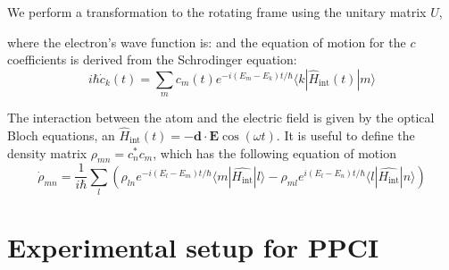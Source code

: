 \documentclass[11pt,letter]{article}
\newcommand{\bv}[1]{\ensuremath{\bm{#1}}}
\begin{document}
\newpage
 

 We perform a transformation to the rotating
frame using the unitary matrix $U$, 

where the  electron's wave function is:
and the equation of motion for the  $c$ coefficients is derived from the
Schrodinger equation: 
\begin{equation}
 i \hbar \dot{c}_{k}(t) = 
 \sum_{m} c_{m}(t)e^{-i(E_{m}-E_{k})t/\hbar} 
 \langle k | \hat{H}_{\mathrm{int}}(t) | m \rangle 
\end{equation}


The interaction between the atom and the electric field is given by
the optical Bloch equations, an
$\hat{H}_{\mathrm{int}}(t)  = -\bv{d}\cdot\bv{E} \cos( \omega t )$.  It is
useful to define the density matrix $\rho_{mn} = c_{n}^{*}c_{m}$, which has the
following equation of motion 
\begin{equation}
\dot{\rho}_{mn} = 
    \frac{1}{i\hbar} \sum_{l}  \left( 
    \rho_{ln} e^{-i ( E_{l}-E_{m})t/\hbar } 
    \langle m  | \hat{H_{\text{int}}} | l \rangle 
  -  \rho_{ml} e^{i(E_{l}-E_{n}) t/ \hbar } 
    \langle  l | \hat{H_{\text{int}}} | n \rangle 
    \right) 
\end{equation} 



\section{Experimental setup for PPCI} 





\end{document}
